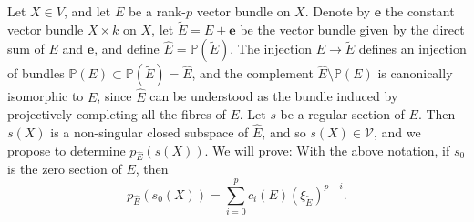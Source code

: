 \documentclass{article}
\theoremstyle{plain}
\newenvironment{lemma}[1]
    {\renewcommand\theinnercustomlemma{#1}\innercustomlemma}
    {\endinnercustomlemma}
\theoremstyle{definition}
\newcommand{\cat}[1]{{\mathcal{#1}}}
\newcommand{\oldpage}[1]{\marginpar{\footnotesize$\Big\vert$ \textit{p.~#1}}}
\begin{document}
\oldpage{152}
Let $X\in V$, and let $E$ be a rank-$p$ vector bundle on $X$.
Denote by $\mathbf{e}$ the constant vector bundle $X\times k$ on $X$, let $\widetilde{E}=E+\mathbf{e}$ be the vector bundle given by the direct sum of $E$ and $\mathbf{e}$, and define $\widehat{E}=\mathbb{P}(\widetilde{E})$.
The injection $E\to\widetilde{E}$ defines an injection of bundles $\mathbb{P}(E)\subset\mathbb{P}(\widetilde{E})=\widehat{E}$, and the complement $\widehat{E}\setminus\mathbb{P}(E)$ is canonically isomorphic to $E$, since $\widehat{E}$ can be understood as the bundle induced by projectively completing all the fibres of $E$.
Let $s$ be a regular section of $E$.
Then $s(X)$ is a non-singular closed subspace of $\widehat{E}$, and so $s(X)\in\cat{V}$, and we propose to determine $p_{\widehat{E}}(s(X))$.
We will prove:
\begin{lemma}{3}
\label{lemma3}
  With the above notation, if $s_0$ is the zero section of $E$, then
  \[
  \label{equation17}
    p_{\widehat{E}}(s_0(X)) = \sum_{i=0}^p c_i(E)(\xi_{\widetilde{E}})^{p-i}.
  \tag{17}
  \]
\end{lemma}
\end{document}
